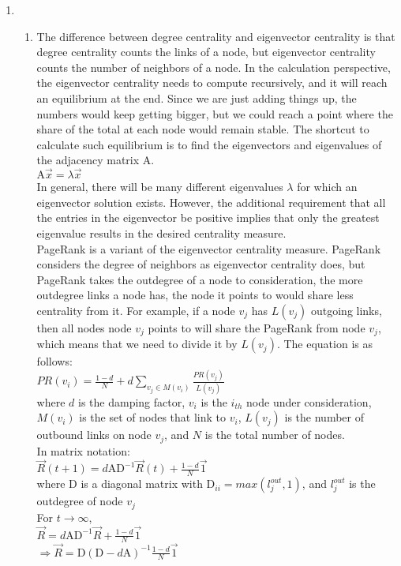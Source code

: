 \documentclass[10pt, a4paper]{article}
\begin{document}
\begin{enumerate}
\item\mbox{}
    \begin{enumerate}
    \item\mbox{}
        The difference between degree centrality and eigenvector centrality is that degree centrality counts the links of a node, but eigenvector centrality counts the number of neighbors of a node. In the calculation perspective, the eigenvector centrality needs to compute recursively, and it will reach an equilibrium at the end. Since we are just adding things up, the numbers would keep getting bigger, but we could reach a point where the share of the total at each node would remain stable. The shortcut to calculate such equilibrium is to find the eigenvectors and eigenvalues of the adjacency matrix A.\\
        $\mbox{A}\vec{x} = \lambda\vec{x}$\\
        In general, there will be many different eigenvalues $\lambda$ for which an eigenvector solution exists. However, the additional requirement that all the entries in the eigenvector be positive implies that only the greatest eigenvalue results in the desired centrality measure.\\

        PageRank is a variant of the eigenvector centrality measure. PageRank considers the degree of neighbors as eigenvector centrality does, but PageRank takes the outdegree of a node to consideration, the more outdegree links a node has, the node it points to would share less centrality from it. For example, if a node $v_j$ has $L\left(v_j\right)$ outgoing links, then all nodes node $v_j$ points to will share the PageRank from node $v_j$, which means that we need to divide it by $L\left(v_j\right)$. The equation is as follows:\\
        $PR\left(v_i\right) = \frac{1-d}{N} + d \displaystyle\sum_{v_j \in M\left(v_i\right)} \frac{PR\left(v_j\right)}{L\left(v_j\right)}$\\
        where $d$ is the damping factor, $v_i$ is the $i_{th}$ node under consideration, $M\left(v_i\right)$ is the set of nodes that link to $v_i$, $L\left(v_j\right)$ is the number of outbound links on node $v_j$, and $N$ is the total number of nodes.\\
        In matrix notation:\\
        $\vec{R}\left(t + 1\right) = d\mbox{A}\mbox{D}^{-1}\vec{R}\left(t\right) + \frac{1 - d}{N}\vec{1}$\\
        where D is a diagonal matrix with $\mbox{D}_{ii} = max(l_j^{out}, 1)$, and $l_j^{out}$ is the outdegree of node $v_j$\\
        For $t \rightarrow \infty$,\\
        $\vec{R} = d\mbox{A}\mbox{D}^{-1}\vec{R} + \frac{1 - d}{N}\vec{1}$\\
        $\Rightarrow \vec{R} = \mbox{D}\left(\mbox{D} - d\mbox{A}\right)^{-1}\frac{1 - d}{N}\vec{1}$\\


\end{enumerate}
\end{enumerate}
\end{document}
